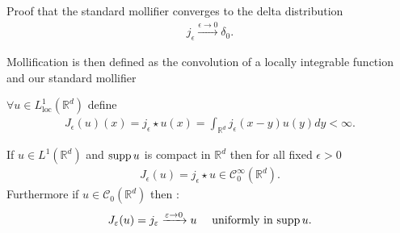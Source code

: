 \begin{exercise}
 Proof that the standard mollifier converges to the delta distribution
 \begin{align*}
   j_{\epsilon }\xrightarrow{\epsilon  \to 0} \delta_0
 .\end{align*}
\end{exercise}
Mollification is then defined  as the convolution of a locally integrable function and our standard mollifier
\begin{definition}
  $\forall u \in  L_{\text{loc}}^{1}(\mathbb{R}^{d} ) $ define 
  \begin{align*}
    J_{\epsilon }(u)(x) = j_{\epsilon } \star u(x) = \int_{\mathbb{R}^{d} } j_{\epsilon }(x-y) u(y) dy  < \infty
  .\end{align*}
\end{definition}
\begin{lemma}
 If $u \in  L^{1}(\mathbb{R}^{d} ) $  and $\operatorname*{supp} u$ is compact in $\mathbb{R}^{d} $ then for all fixed $\epsilon  >0$
 \begin{align*}
   J_{\epsilon }(u) = j_{\epsilon } \star  u \in  \mathcal{C}_0^{\infty} (\mathbb{R}^{d} )
 .\end{align*} 
 Furthermore if $u \in  \mathcal{C}_0(\mathbb{R}^{d } )$ then : 
 \begin{align*}
   J_{\varepsilon }(u) = j_{\varepsilon } \xrightarrow{\varepsilon \to 0} u \quad \text{ uniformly in $\operatorname*{supp} u$}
 .\end{align*} 
\end{lemma}
